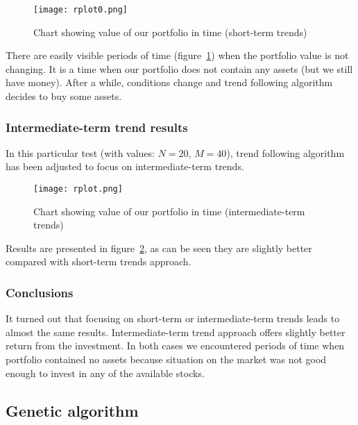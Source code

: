 \begin{figure}[ht]
  
  \begin{center}
    \texttt{[image: rplot0.png]}
  \end{center}
  \caption{Chart showing value of our portfolio in time (short-term trends)}
  \label{fig:trend-short}
\end{figure}

There are easily visible periods of time (figure~\ref{fig:trend-short}) when the portfolio value is not changing. 
It is a time when our portfolio does not contain any assets (but we still have money). 
After a while, conditions change and trend following algorithm decides to buy some assets.


\subsubsection{Intermediate-term trend results}
\label{trend-foll-inter}

In this particular test (with values: $N = 20$, $M = 40$), trend following algorithm has been adjusted to focus on intermediate-term trends.
 
\begin{figure}[H]
  \begin{center}
    \texttt{[image: rplot.png]}
  \end{center}
  \caption{Chart showing value of our portfolio in time (intermediate-term trends)}
  \label{fig:trend-int}
\end{figure}

Results are presented in figure~\ref{fig:trend-int}, as can be seen they are slightly better compared with short-term trends approach.  

\subsubsection{Conclusions}

It turned out that focusing on short-term or intermediate-term trends leads to almost the same results.
Intermediate-term trend approach offers slightly better return from the investment.
In both cases we encountered periods of time when portfolio contained no assets because situation on the market was not good enough to invest in any of the available stocks.



\subsection{Genetic algorithm}

